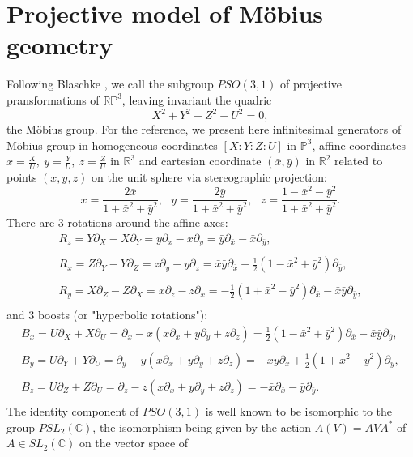 \documentclass[11pt,a4paper]{article}
\begin{document}
\section{Projective model of Möbius geometry}
Following Blaschke \cite{B-29}, we call   the subgroup $PSO(3,1)$ of  projective pransformations of $\mathbb{RP}^3$, leaving invariant the quadric 
$$
X^2+Y^2+Z^2-U^2=0,
$$ 
the Möbius group. 
For the reference, we present here infinitesimal generators of Möbius group  in homogeneous coordinates $[X:Y:Z:U]$ in $\mathbb{P}^3$, affine coordinates $x=\frac{X}{U},\ y=\frac{Y}{U},\ z=\frac{Z}{U}$ in $\mathbb{R}^3$ and cartesian coordinate $(\bar{x},\bar{y})$ in $\mathbb{R}^2$ related to points $(x,y,z)$ on the unit sphere via stereographic projection: 
$$
x=\frac{2\bar{x}}{1+\bar{x}^2+\bar{y}^2},\ \ \ y=\frac{2\bar{y}}{1+\bar{x}^2+\bar{y}^2},\ \ \ z=\frac{1-\bar{x}^2-\bar{y}^2}{1+\bar{x}^2+\bar{y}^2}.
$$
There are 3 rotations around the affine axes: 
$$
\begin{array}{l}
R_z=Y\partial_X-X\partial_Y=y\partial_x-x\partial_y=\bar{y}\partial_{\bar{x}}-\bar{x}\partial_{\bar{y}},\\
\\
R_x=Z\partial_Y-Y\partial_Z=z\partial_y-y\partial_z=\bar{x}\bar{y}\partial_{\bar{x}}+\frac{1}{2} (1-\bar{x}^2+\bar{y}^2)\partial_{\bar{y}},\\
\\
R_y=X\partial_Z-Z\partial_X=x\partial_z-z\partial_x=-\frac{1}{2} (1+\bar{x}^2-\bar{y}^2)\partial_{\bar{x}}-\bar{x}\bar{y}\partial_{\bar{y}},\\
\end{array}
$$
and 3 boosts (or "hyperbolic rotations"):
$$
\begin{array}{l}
B_x=U\partial_X+X\partial_U=\partial_x-x(x\partial_x+y\partial_y+z\partial_z)=\frac{1}{2} (1-\bar{x}^2+\bar{y}^2)\partial_{\bar{x}}-\bar{x}\bar{y}\partial_{\bar{y}},\\
\\
B_y=U\partial_Y+Y\partial_U=\partial_y-y(x\partial_x+y\partial_y+z\partial_z)= -\bar{x}\bar{y}\partial_{\bar{x}}+\frac{1}{2} (1+\bar{x}^2-\bar{y}^2)\partial_{\bar{y}},\\
\\
B_z=U\partial_Z+Z\partial_U=\partial_z-z(x\partial_x+y\partial_y+z\partial_z)=-\bar{x}\partial_{\bar{x}}-\bar{y}\partial_{\bar{y}}.\\
\end{array}
$$
The identity component of $PSO(3,1)$  is well known to be isomorphic to the group $PSL_2(\mathbb{C})$, the isomorphism being given by the action $A(V)=AVA^*$ of $A\in SL_2(\mathbb{C})$ on the vector space of 
\end{document}
